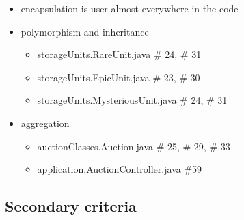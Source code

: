 \documentclass[
]{report}
\providecommand{\tightlist}{%
  \setlength{\itemsep}{0pt}\setlength{\parskip}{0pt}}
\begin{document}
\begin{itemize}
\tightlist
\item
  encapsulation is user almost everywhere in the code
\item
  polymorphism and inheritance

  \begin{itemize}
  \tightlist
  \item
    storageUnits.RareUnit.java \# 24, \# 31
  \item
    storageUnits.EpicUnit.java \# 23, \# 30
  \item
    storageUnits.MysteriousUnit.java \# 24, \# 31
  \end{itemize}
\item
  aggregation

  \begin{itemize}
  \tightlist
  \item
    auctionClasses.Auction.java \# 25, \# 29, \# 33
  \item
    application.AuctionController.java \#59
  \end{itemize}
\end{itemize}

\hypertarget{secondary-criteria}{%
\subsection{Secondary criteria}\label{secondary-criteria}}
\end{document}
